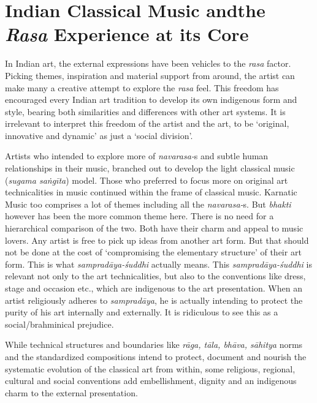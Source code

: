 \vspace{-.5cm}

\section*{Indian Classical Music and\hfill \break the \textit{Rasa} Experience at its Core}

\vspace{-.2cm}

In Indian art, the external expressions have been vehicles to the \textit{rasa} factor. Picking themes, inspiration and material support from around, the artist can make many a creative attempt to explore the \textit{rasa} feel. This freedom has encouraged every Indian art tradition to develop its own indigenous form and style, bearing both similarities and differences with other art systems. It is irrelevant to interpret this freedom of the artist and the art, to be ‘original, innovative and dynamic’ as just a ‘social division’.

Artists who intended to explore more of \textit{navarasa-}s and subtle human relationships in their music, branched out to develop the light classical music (\textit{sugama saṅgīta}) model. Those who preferred to focus more on original art technicalities in music continued within the frame of classical music. Karnatic Music too comprises a lot of themes including all the \textit{navarasa-}s. But \textit{bhakti} however has been the more common theme here. There is no need for a hierarchical comparison of the two. Both have their charm and appeal to music lovers. Any artist is free to pick up ideas from another art form. But that should not be done at the cost of ‘compromising the elementary structure’ of their art form. This is what \textit{sampradāya-śuddhi} actually means. This \textit{sampradāya-śuddhi} is relevant not only to the art technicalities, but also to the conventions like dress, stage and occasion etc., which are indigenous to the art presentation. When an artist religiously adheres to \textit{sampradāya}, he is actually intending to protect the purity of his art internally and externally. It is ridiculous to see this as a social/brahminical prejudice.

While technical structures and boundaries like \textit{rāga, tāla, bhāva, sāhitya} norms and the standardized compositions intend to protect, document and nourish the systematic evolution of the classical art from within, some religious, regional, cultural and social conventions add embellishment, dignity and an indigenous charm to the external presentation.


